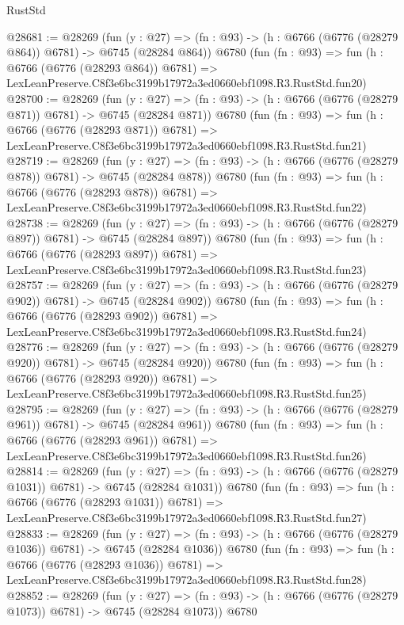 \begin{lexlean}{RustStd}
\begin{coremodule}
@28681 := @28269
    (fun (y : @27) => (fn : @93) -> (h : @6766 (@6776 (@28279 @864)) @6781) -> @6745 (@28284 @864))
    @6780
    (fun (fn : @93) =>
    fun (h : @6766 (@6776 (@28293 @864)) @6781) =>
    LexLeanPreserve.C8f3e6bc3199b17972a3ed0660ebf1098.R3.RustStd.fun20)
@28700 := @28269
    (fun (y : @27) => (fn : @93) -> (h : @6766 (@6776 (@28279 @871)) @6781) -> @6745 (@28284 @871))
    @6780
    (fun (fn : @93) =>
    fun (h : @6766 (@6776 (@28293 @871)) @6781) =>
    LexLeanPreserve.C8f3e6bc3199b17972a3ed0660ebf1098.R3.RustStd.fun21)
@28719 := @28269
    (fun (y : @27) => (fn : @93) -> (h : @6766 (@6776 (@28279 @878)) @6781) -> @6745 (@28284 @878))
    @6780
    (fun (fn : @93) =>
    fun (h : @6766 (@6776 (@28293 @878)) @6781) =>
    LexLeanPreserve.C8f3e6bc3199b17972a3ed0660ebf1098.R3.RustStd.fun22)
@28738 := @28269
    (fun (y : @27) => (fn : @93) -> (h : @6766 (@6776 (@28279 @897)) @6781) -> @6745 (@28284 @897))
    @6780
    (fun (fn : @93) =>
    fun (h : @6766 (@6776 (@28293 @897)) @6781) =>
    LexLeanPreserve.C8f3e6bc3199b17972a3ed0660ebf1098.R3.RustStd.fun23)
@28757 := @28269
    (fun (y : @27) => (fn : @93) -> (h : @6766 (@6776 (@28279 @902)) @6781) -> @6745 (@28284 @902))
    @6780
    (fun (fn : @93) =>
    fun (h : @6766 (@6776 (@28293 @902)) @6781) =>
    LexLeanPreserve.C8f3e6bc3199b17972a3ed0660ebf1098.R3.RustStd.fun24)
@28776 := @28269
    (fun (y : @27) => (fn : @93) -> (h : @6766 (@6776 (@28279 @920)) @6781) -> @6745 (@28284 @920))
    @6780
    (fun (fn : @93) =>
    fun (h : @6766 (@6776 (@28293 @920)) @6781) =>
    LexLeanPreserve.C8f3e6bc3199b17972a3ed0660ebf1098.R3.RustStd.fun25)
@28795 := @28269
    (fun (y : @27) => (fn : @93) -> (h : @6766 (@6776 (@28279 @961)) @6781) -> @6745 (@28284 @961))
    @6780
    (fun (fn : @93) =>
    fun (h : @6766 (@6776 (@28293 @961)) @6781) =>
    LexLeanPreserve.C8f3e6bc3199b17972a3ed0660ebf1098.R3.RustStd.fun26)
@28814 := @28269
    (fun (y : @27) =>
    (fn : @93) -> (h : @6766 (@6776 (@28279 @1031)) @6781) -> @6745 (@28284 @1031))
    @6780
    (fun (fn : @93) =>
    fun (h : @6766 (@6776 (@28293 @1031)) @6781) =>
    LexLeanPreserve.C8f3e6bc3199b17972a3ed0660ebf1098.R3.RustStd.fun27)
@28833 := @28269
    (fun (y : @27) =>
    (fn : @93) -> (h : @6766 (@6776 (@28279 @1036)) @6781) -> @6745 (@28284 @1036))
    @6780
    (fun (fn : @93) =>
    fun (h : @6766 (@6776 (@28293 @1036)) @6781) =>
    LexLeanPreserve.C8f3e6bc3199b17972a3ed0660ebf1098.R3.RustStd.fun28)
@28852 := @28269
    (fun (y : @27) =>
    (fn : @93) -> (h : @6766 (@6776 (@28279 @1073)) @6781) -> @6745 (@28284 @1073))
    @6780

\end{coremodule}
\end{lexlean}
